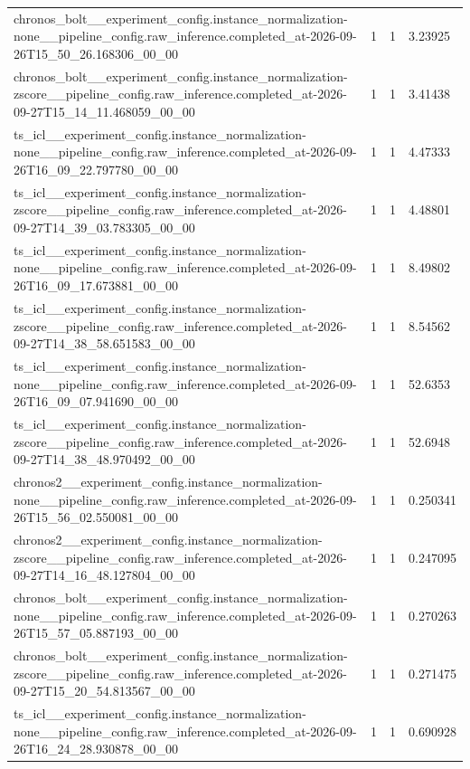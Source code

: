 \begin{tabular}{llll}
chronos\_bolt\_\_experiment\_config.instance\_normalization-none\_\_pipeline\_config.raw\_inference.completed\_at-2026-09-26T15\_50\_26.168306\_00\_00 & 1 & 1 & 3.23925 \\
chronos\_bolt\_\_experiment\_config.instance\_normalization-zscore\_\_pipeline\_config.raw\_inference.completed\_at-2026-09-27T15\_14\_11.468059\_00\_00 & 1 & 1 & 3.41438 \\
ts\_icl\_\_experiment\_config.instance\_normalization-none\_\_pipeline\_config.raw\_inference.completed\_at-2026-09-26T16\_09\_22.797780\_00\_00 & 1 & 1 & 4.47333 \\
ts\_icl\_\_experiment\_config.instance\_normalization-zscore\_\_pipeline\_config.raw\_inference.completed\_at-2026-09-27T14\_39\_03.783305\_00\_00 & 1 & 1 & 4.48801 \\
ts\_icl\_\_experiment\_config.instance\_normalization-none\_\_pipeline\_config.raw\_inference.completed\_at-2026-09-26T16\_09\_17.673881\_00\_00 & 1 & 1 & 8.49802 \\
ts\_icl\_\_experiment\_config.instance\_normalization-zscore\_\_pipeline\_config.raw\_inference.completed\_at-2026-09-27T14\_38\_58.651583\_00\_00 & 1 & 1 & 8.54562 \\
ts\_icl\_\_experiment\_config.instance\_normalization-none\_\_pipeline\_config.raw\_inference.completed\_at-2026-09-26T16\_09\_07.941690\_00\_00 & 1 & 1 & 52.6353 \\
ts\_icl\_\_experiment\_config.instance\_normalization-zscore\_\_pipeline\_config.raw\_inference.completed\_at-2026-09-27T14\_38\_48.970492\_00\_00 & 1 & 1 & 52.6948 \\
chronos2\_\_experiment\_config.instance\_normalization-none\_\_pipeline\_config.raw\_inference.completed\_at-2026-09-26T15\_56\_02.550081\_00\_00 & 1 & 1 & 0.250341 \\
chronos2\_\_experiment\_config.instance\_normalization-zscore\_\_pipeline\_config.raw\_inference.completed\_at-2026-09-27T14\_16\_48.127804\_00\_00 & 1 & 1 & 0.247095 \\
chronos\_bolt\_\_experiment\_config.instance\_normalization-none\_\_pipeline\_config.raw\_inference.completed\_at-2026-09-26T15\_57\_05.887193\_00\_00 & 1 & 1 & 0.270263 \\
chronos\_bolt\_\_experiment\_config.instance\_normalization-zscore\_\_pipeline\_config.raw\_inference.completed\_at-2026-09-27T15\_20\_54.813567\_00\_00 & 1 & 1 & 0.271475 \\
ts\_icl\_\_experiment\_config.instance\_normalization-none\_\_pipeline\_config.raw\_inference.completed\_at-2026-09-26T16\_24\_28.930878\_00\_00 & 1 & 1 & 0.690928 \\

\end{tabular}
